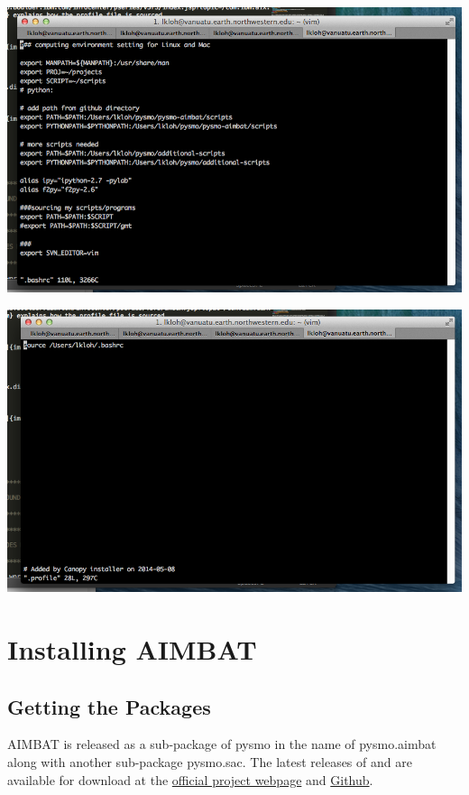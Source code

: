 \documentclass[letterpaper,10pt,english]{sphinxmanual}
\begin{document}
\includegraphics{bashrc_home.png}

\includegraphics{profile_home.png}


\chapter{Installing AIMBAT}
\label{docfiles/install_aimbat::doc}\label{docfiles/install_aimbat:installing-aimbat}

\section{Getting the Packages}
\label{docfiles/install_aimbat:getting-the-packages}
AIMBAT is released as a sub-package of pysmo in the name of pysmo.aimbat along with another sub-package pysmo.sac. The latest releases of  and  are available for download at the \href{http://www.earth.northwestern.edu/~xlou/aimbat.html}{official project webpage} and \href{https://github.com/pysmo}{Github}.
\end{document}
